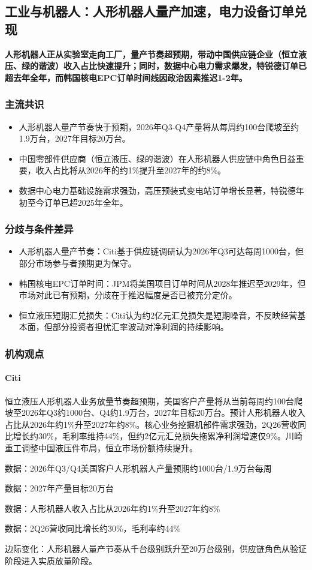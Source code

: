 \documentclass[11pt]{ctexart}
\begin{document}
\subsection{工业与机器人：人形机器人量产加速，电力设备订单兑现}
\textbf{人形机器人正从实验室走向工厂，量产节奏超预期，带动中国供应链企业（恒立液压、绿的谐波）收入占比快速提升；同时，数据中心电力需求爆发，特锐德订单已超去年全年，而韩国核电EPC订单时间线因政治因素推迟1-2年。}
\subsubsection*{主流共识}
\begin{itemize}
  \item 人形机器人量产节奏快于预期，2026年Q3-Q4产量将从每周约100台爬坡至约1.9万台，2027年目标20万台。
  \item 中国零部件供应商（恒立液压、绿的谐波）在人形机器人供应链中角色日益重要，收入占比将从2026年的约1\%提升至2027年的约8\%。
  \item 数据中心电力基础设施需求强劲，高压预装式变电站订单增长显著，特锐德年初至今订单已超2025年全年。
\end{itemize}
\subsubsection*{分歧与条件差异}
\begin{itemize}
  \item 人形机器人量产节奏：Citi基于供应链调研认为2026年Q3可达每周1000台，但部分市场参与者预期更为保守。
  \item 韩国核电EPC订单时间：JPM将美国项目订单时间从2028年推迟至2029年，但市场对此已有预期，分歧在于推迟幅度是否已被充分定价。
  \item 恒立液压短期汇兑损失：Citi认为约2亿元汇兑损失是短期噪音，不反映经营基本面，但部分投资者担忧汇率波动对净利润的持续影响。
\end{itemize}
\subsubsection*{机构观点}
\paragraph{Citi} 恒立液压人形机器人业务放量节奏超预期，美国客户产量将从当前每周约100台爬坡至2026年Q3约1000台、Q4约1.9万台，2027年目标20万台。预计人形机器人收入占比从2026年约1\%升至2027年约8\%。核心业务挖掘机部件需求强劲，2Q26营收同比增长约30\%，毛利率维持44\%，但约2亿元汇兑损失拖累净利润增速仅9\%。川崎重工调整中国液压件布局，恒立市场份额持续提升。
{\small\color{refgray}数据：2026年Q3/Q4美国客户人形机器人产量预期约1000台/1.9万台每周\par}
{\small\color{refgray}数据：2027年产量目标20万台\par}
{\small\color{refgray}数据：人形机器人收入占比从2026年约1\%升至2027年约8\%\par}
{\small\color{refgray}数据：2Q26营收同比增长约30\%，毛利率约44\%\par}
{\small\color{refgray}边际变化：人形机器人量产节奏从千台级别跃升至20万台级别，供应链角色从验证阶段进入实质放量阶段。\par}
\end{document}
